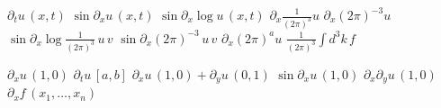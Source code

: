 \documentclass{article}
\begin{document}
$\partial_t u\,(x,t)$ $\sin\partial_x u\,(x,t)$ $\sin\partial_x\log u\,(x,t)$ $\partial_x\frac{1}{(2\pi)^3}u$ $\partial_x(2\pi)^{-3}u$
$\sin\partial_x\log\frac{1}{(2\pi)^3}\,u\,v$ $\sin\partial_x(2\pi)^{-3}\,u\,v$ $\partial_x(2\pi)^a u$ $\frac{1}{(2\pi)^3}\int d^3k\,f$

$\partial_x u\,(1,0)$ $\partial_t u\,[a,b]$ $\partial_x u\,(1,0)+\partial_y u\,(0,1)$ $\sin\partial_x u\,(1,0)$
$\partial_x\partial_y u\,(1,0)$ $\partial_x f\,(x_1,\ldots,x_n)$
\end{document}
